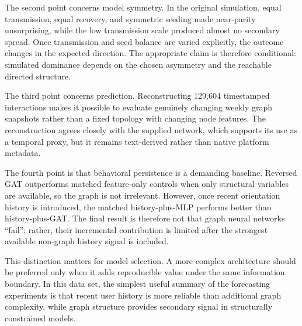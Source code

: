 \documentclass[11pt,a4paper]{article}
\begin{document}
The second point concerns model symmetry. In the original simulation, equal transmission, equal recovery, and symmetric seeding made near-parity unsurprising, while the low transmission scale produced almost no secondary spread. Once transmission and seed balance are varied explicitly, the outcome changes in the expected direction. The appropriate claim is therefore conditional: simulated dominance depends on the chosen asymmetry and the reachable directed structure.

The third point concerns prediction. Reconstructing 129,604 timestamped interactions makes it possible to evaluate genuinely changing weekly graph snapshots rather than a fixed topology with changing node features. The reconstruction agrees closely with the supplied network, which supports its use as a temporal proxy, but it remains text-derived rather than native platform metadata.

The fourth point is that behavioral persistence is a demanding baseline. Reversed GAT outperforms matched feature-only controls when only structural variables are available, so the graph is not irrelevant. However, once recent orientation history is introduced, the matched history-plus-MLP performs better than history-plus-GAT. The final result is therefore not that graph neural networks ``fail''; rather, their incremental contribution is limited after the strongest available non-graph history signal is included.

This distinction matters for model selection. A more complex architecture should be preferred only when it adds reproducible value under the same information boundary. In this data set, the simplest useful summary of the forecasting experiments is that recent user history is more reliable than additional graph complexity, while graph structure provides secondary signal in structurally constrained models.
\end{document}
